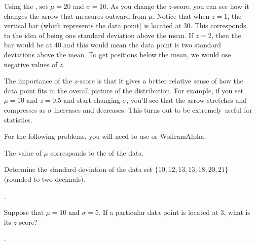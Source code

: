 \documentclass{ximera}
\begin{document}
Using the , set $\mu = 20$ and $\sigma = 10$. As you change the $z$-score, you can see how it changes the arrow that measures outward from $\mu$. Notice that when $z = 1$, the vertical bar (which represents the data point) is located at 30. This corresponds to the idea of being one standard deviation above the mean. If $z = 2$, then the bar would be at 40 and this would mean the data point is two standard deviations above the mean. To get positions below the mean, we would use negative values of $z$.

The importance of the $z$-score is that it gives a better relative sense of how the data point fits in the overall picture of the distribution. For example, if you set $\mu = 10$ and $z = 0.5$ and start changing $\sigma$, you'll see that the arrow stretches and compresses as $\sigma$ increases and decreases. This turns out to be extremely useful for statistics.

For the following problems, you will need to use  or WolframAlpha.

\begin{question}
The value of $\mu$ corresponds to the \underline{\hspace{30pt}} of the data.

    \begin{multipleChoice}
    \end{multipleChoice}

\end{question}

\begin{question}
Determine the standard deviation of the data set $\{ 10, 12, 13, 13, 18, 20, 21\}$ (rounded to two decimals).

    .

\end{question}

\begin{question}
Suppose that $\mu = 10$ and $\sigma = 5$. If a particular data point is located at 3, what is its $z$-score?

    .

\end{question}
\end{document}
